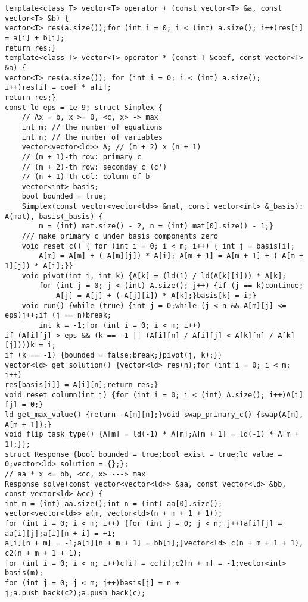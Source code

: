 \documentclass[12pt]{article}
\begin{document}
\begin{verbatim}
template<class T> vector<T> operator + (const vector<T> &a, const vector<T> &b) {
vector<T> res(a.size());for (int i = 0; i < (int) a.size(); i++)res[i] = a[i] + b[i];
return res;}
template<class T> vector<T> operator * (const T &coef, const vector<T> &a) {
vector<T> res(a.size()); for (int i = 0; i < (int) a.size(); i++)res[i] = coef * a[i];
return res;}
const ld eps = 1e-9; struct Simplex {
    // Ax = b, x >= 0, <c, x> -> max
    int m; // the number of equations
    int n; // the number of variables
    vector<vector<ld>> A; // (m + 2) x (n + 1)
    // (m + 1)-th row: primary c
    // (m + 2)-th row: seconday c (c')
    // (n + 1)-th col: column of b
    vector<int> basis;
    bool bounded = true;
    Simplex(const vector<vector<ld>> &mat, const vector<int> &_basis): A(mat), basis(_basis) {
        m = (int) mat.size() - 2, n = (int) mat[0].size() - 1;}
    /// make primary c under basis components zero
    void reset_c() { for (int i = 0; i < m; i++) { int j = basis[i];
        A[m] = A[m] + (-A[m][j]) * A[i]; A[m + 1] = A[m + 1] + (-A[m + 1][j]) * A[i];}}
    void pivot(int i, int k) {A[k] = (ld(1) / ld(A[k][i])) * A[k];
        for (int j = 0; j < (int) A.size(); j++) {if (j == k)continue;
            A[j] = A[j] + (-A[j][i]) * A[k];}basis[k] = i;}
    void run() {while (true) {int j = 0;while (j < n && A[m][j] <= eps)j++;if (j == n)break;
        int k = -1;for (int i = 0; i < m; i++)
if (A[i][j] > eps && (k == -1 || (A[i][n] / A[i][j] < A[k][n] / A[k][j])))k = i;
if (k == -1) {bounded = false;break;}pivot(j, k);}}
vector<ld> get_solution() {vector<ld> res(n);for (int i = 0; i < m; i++)
res[basis[i]] = A[i][n];return res;}
void reset_column(int j) {for (int i = 0; i < (int) A.size(); i++)A[i][j] = 0;}
ld get_max_value() {return -A[m][n];}void swap_primary_c() {swap(A[m], A[m + 1]);}
void flip_task_type() {A[m] = ld(-1) * A[m];A[m + 1] = ld(-1) * A[m + 1];}};
struct Response {bool bounded = true;bool exist = true;ld value = 0;vector<ld> solution = {};};
// aa * x <= bb, <cc, x> ---> max
Response solve(const vector<vector<ld>> &aa, const vector<ld> &bb, const vector<ld> &cc) {
int m = (int) aa.size();int n = (int) aa[0].size();
vector<vector<ld>> a(m, vector<ld>(n + m + 1 + 1));
for (int i = 0; i < m; i++) {for (int j = 0; j < n; j++)a[i][j] = aa[i][j];a[i][n + i] = +1;
a[i][n + m] = -1;a[i][n + m + 1] = bb[i];}vector<ld> c(n + m + 1 + 1), c2(n + m + 1 + 1);
for (int i = 0; i < n; i++)c[i] = cc[i];c2[n + m] = -1;vector<int> basis(m);
for (int j = 0; j < m; j++)basis[j] = n + j;a.push_back(c2);a.push_back(c);

\end{verbatim}
\end{document}
